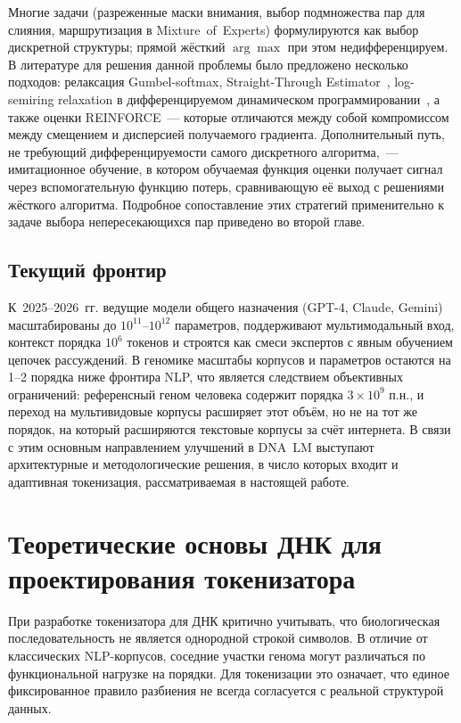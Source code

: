 Многие задачи (разреженные маски внимания, выбор подмножества пар для
слияния, маршрутизация в Mixture~of~Experts) формулируются как выбор
дискретной структуры; прямой жёсткий $\arg\max$ при этом
недифференцируем. В литературе для решения данной проблемы было
предложено несколько подходов: релаксация Gumbel-softmax,
Straight-Through Estimator~\cite{bengioEstimatingPropagatingGradients2013},
log-semiring relaxation в дифференцируемом динамическом
программировании~\cite{menschDifferentiableDynamicProgramming2018},
а также оценки REINFORCE~--- которые отличаются между собой
компромиссом между смещением и дисперсией получаемого градиента.
Дополнительный путь, не требующий дифференцируемости самого
дискретного алгоритма,~--- имитационное обучение, в котором обучаемая
функция оценки получает сигнал через вспомогательную функцию потерь,
сравнивающую её выход с решениями жёсткого алгоритма. Подробное
сопоставление этих стратегий применительно к задаче выбора
непересекающихся пар приведено во второй главе.

\subsection{Текущий фронтир}

К~2025--2026~гг. ведущие модели общего назначения (GPT-4, Claude,
Gemini) масштабированы до $10^{11}$--$10^{12}$ параметров,
поддерживают мультимодальный вход, контекст порядка $10^6$ токенов и
строятся как смеси экспертов с явным обучением цепочек рассуждений.
В геномике масштабы корпусов и параметров остаются на 1--2 порядка
ниже фронтира NLP, что является следствием объективных ограничений:
референсный геном человека содержит порядка $3 \times 10^9$ п.н., и
переход на мультивидовые корпусы расширяет этот объём, но не на тот же
порядок, на который расширяются текстовые корпусы за счёт интернета.
В связи с этим основным направлением улучшений в DNA~LM выступают
архитектурные и методологические решения, в число которых входит и
адаптивная токенизация, рассматриваемая в настоящей работе.

\section{Теоретические основы ДНК для проектирования токенизатора}

При разработке токенизатора для ДНК критично учитывать, что
биологическая последовательность не является однородной строкой
символов. В отличие от классических NLP-корпусов, соседние участки
генома могут различаться по функциональной нагрузке на порядки. Для
токенизации это означает, что единое фиксированное правило разбиения
не всегда согласуется с реальной структурой данных.


